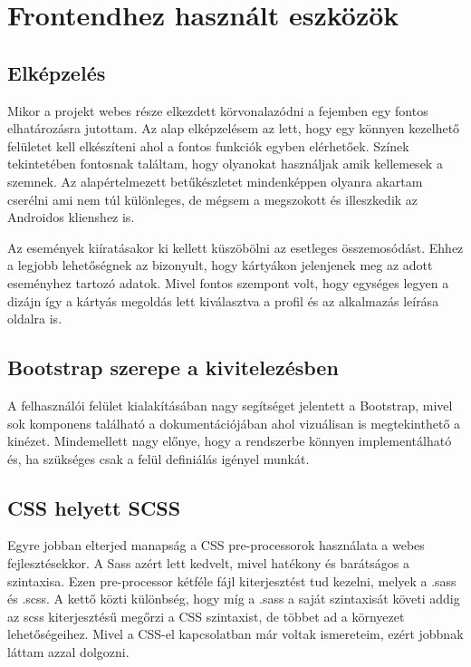 \documentclass[
]{thesis-ekf}
\theoremstyle{definition}
\theoremstyle{remark}
\begin{document}
	\section{Frontendhez használt eszközök}
	\subsection{Elképzelés}
	Mikor a projekt webes része elkezdett körvonalazódni a fejemben egy fontos elhatározásra jutottam. Az alap elképzelésem az lett, hogy egy könnyen kezelhető felületet kell elkészíteni ahol a fontos funkciók egyben elérhetőek. Színek tekintetében fontosnak találtam, hogy olyanokat használjak amik kellemesek a szemnek. Az alapértelmezett betűkészletet mindenképpen olyanra akartam cserélni ami nem túl különleges, de mégsem a megszokott és illeszkedik az Androidos klienshez is.
	
	Az események kiíratásakor ki kellett küszöbölni az esetleges összemosódást. Ehhez a legjobb lehetőségnek az bizonyult, hogy kártyákon jelenjenek meg az adott eseményhez tartozó adatok. Mivel fontos szempont volt, hogy egységes legyen a dizájn így a kártyás megoldás lett kiválasztva a profil és az alkalmazás leírása oldalra is. 
	
	\subsection{Bootstrap szerepe a kivitelezésben}
	
	A felhasználói felület kialakításában nagy segítséget jelentett a Bootstrap, mivel sok komponens található a dokumentációjában ahol vizuálisan is megtekinthető a kinézet. Mindemellett nagy előnye, hogy a rendszerbe könnyen implementálható és, ha szükséges csak a felül definiálás igényel munkát.
	
	\subsection{CSS helyett SCSS}
	
	Egyre jobban elterjed manapság a CSS pre-processorok használata a webes fejlesztésekkor. A Sass azért lett kedvelt, mivel hatékony és barátságos a szintaxisa. Ezen pre-processor kétféle fájl kiterjesztést tud kezelni, melyek a .sass és .scss. A kettő közti különbség, hogy míg a .sass a saját szintaxisát követi addig az scss kiterjesztésű megőrzi a CSS szintaxist, de többet ad a környezet lehetőségeihez. Mivel a CSS-el kapcsolatban már voltak ismereteim, ezért jobbnak láttam azzal dolgozni. 
	
\end{document}
